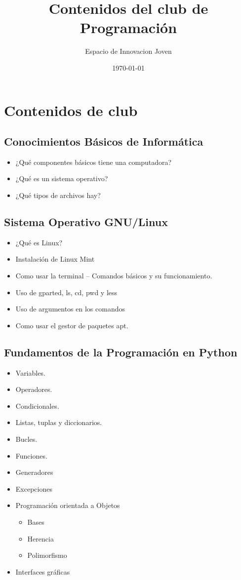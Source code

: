 \documentclass{article}
\title{Contenidos del club de Programación}
\date{\today}
\author{Espacio de Innovacion Joven}
\begin{document}
\maketitle
\thispagestyle{fancy}

\section{Contenidos de club}

\subsection{Conocimientos Básicos de Informática}
\begin{itemize}
	\item ¿Qué componentes básicos tiene una computadora?
	\item ¿Qué es un sistema operativo?
	\item ¿Qué tipos de archivos hay?
\end{itemize}

\subsection{Sistema Operativo GNU/Linux}
\begin{itemize}
	\item ¿Qué es Linux?
	\item Instalación de Linux Mint
	\item Como usar la terminal -- Comandos básicos y su funcionamiento.
	\item Uso de gparted, ls, cd, pwd y less
	\item Uso de argumentos en los comandos
	\item Como usar el gestor de paquetes apt.
\end{itemize}

\thispagestyle{fancy}
\subsection{Fundamentos de la Programación en Python}
\begin{itemize}
	\item Variables.
	\item Operadores.
	\item Condicionales.
	\item Listas, tuplas y diccionarios.
	\item Bucles.
	\item Funciones.
	\item Generadores
	\item Excepciones
	\item Programación orientada a Objetos
	      \begin{itemize}
		      \item Bases
		      \item Herencia
		      \item Polimorfismo
	      \end{itemize}
	\item Interfaces gráficas
\end{itemize}
\end{document}
